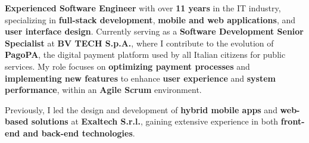 

\begin{cvparagraph}

\textbf{Experienced Software Engineer} with over \textbf{11 years} in the IT industry, specializing in \textbf{full-stack development}, \textbf{mobile and web applications}, and \textbf{user interface design}. Currently serving as a \textbf{Software Development Senior Specialist} at \textbf{BV TECH S.p.A.}, where I contribute to the evolution of \textbf{PagoPA}, the digital payment platform used by all Italian citizens for public services. My role focuses on \textbf{optimizing payment processes} and \textbf{implementing new features} to enhance \textbf{user experience} and \textbf{system performance}, within an \textbf{Agile Scrum} environment. 

Previously, I led the design and development of \textbf{hybrid mobile apps} and \textbf{web-based solutions} at \textbf{Exaltech S.r.l.}, gaining extensive experience in both \textbf{front-end and back-end technologies}.

\end{cvparagraph}
